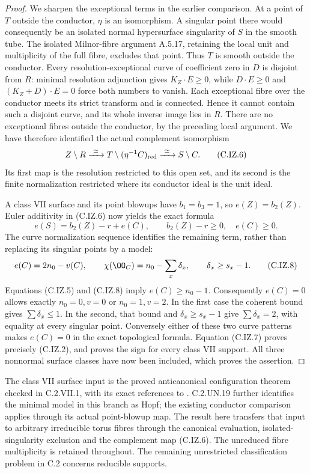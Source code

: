 \begin{proof}
We sharpen the exceptional terms in the earlier comparison.
At a point of $T$ outside the conductor, $\eta$ is an
isomorphism. A singular point there would consequently be
an isolated normal hypersurface singularity of $S$ in
the smooth tube. The isolated Milnor-fibre argument
A.5.17, retaining the local unit and multiplicity of
the full fibre, excludes that point. Thus $T$ is smooth
outside the conductor. Every resolution-exceptional curve
of coefficient zero in $D$ is disjoint from $R$: minimal
resolution adjunction gives $K_Z\cdot E\ge0$, while
$D\cdot E\ge0$ and $(K_Z+D)\cdot E=0$ force both
numbers to vanish. Each exceptional fibre over the
conductor meets its strict transform and is connected.
Hence it cannot contain such a disjoint curve, and its
whole inverse image lies in $R$. There are no exceptional
fibres outside the conductor, by the preceding local
argument. We have therefore identified the actual
complement isomorphism
\[
 Z\setminus R\xrightarrow{\ \simeq\ }
 T\setminus(\eta^{-1}C)_{\rm red}
 \xrightarrow{\ \simeq\ }S\setminus C.                \tag{C.IZ.6}
\]
Its first map is the resolution restricted to this open
set, and its second is the finite normalization restricted
where its conductor ideal is the unit ideal.

A class VII surface and its point blowups have
$b_1=b_3=1$, so $e(Z)=b_2(Z)$. Euler additivity in
(C.IZ.6) now yields the exact formula
\[
 e(S)=b_2(Z)-r+e(C),\qquad
 b_2(Z)-r\ge0,\quad e(C)\ge0.                           \tag{C.IZ.7}
\]
The curve normalization sequence identifies the remaining
term, rather than replacing its singular points by a
model:
\[
 e(C)=2n_0-v(C),\qquad
 \chi(\OO_C)=n_0-\sum_x\delta_x,\qquad
 \delta_x\ge s_x-1.                                    \tag{C.IZ.8}
\]
Equations (C.IZ.5) and (C.IZ.8) imply $e(C)\ge n_0-1$.
Consequently $e(C)=0$ allows exactly $n_0=0,v=0$ or
$n_0=1,v=2$. In the first case the coherent bound gives
$\sum\delta_x\le1$. In the second, that bound and
$\delta_x\ge s_x-1$ give $\sum\delta_x=2$, with equality
at every singular point. Conversely either of these
two curve patterns makes $e(C)=0$ in the exact
topological formula. Equation (C.IZ.7) proves precisely
(C.IZ.2), and proves the sign for every class VII
support. All three nonnormal surface classes have now
been included, which proves the assertion.
\end{proof}

The class VII surface input is the proved anticanonical
configuration theorem checked in C.2.VII.1, with its exact
references to \cite{Dloussky2006,DOT2003}. C.2.UN.19 further
identifies the minimal model in this branch as Hopf;
the existing conductor comparison applies through its
actual point-blowup map. The result here
transfers that input to arbitrary irreducible torus fibres
through the canonical evaluation, isolated-singularity
exclusion and the complement map (C.IZ.6). The unreduced
fibre multiplicity is retained throughout. The remaining
unrestricted classification problem in C.2 concerns
reducible supports.



